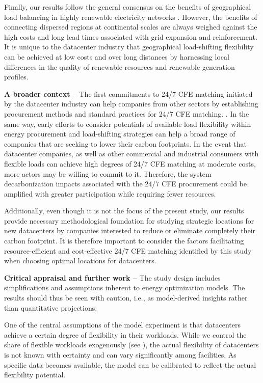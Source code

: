 Finally, our results follow the general consensus on the benefits of geographical load balancing in highly renewable electricity networks \cite{schlachtbergerBenefitsCooperationHighly2017}.
However, the benefits of connecting dispersed regions at continental scales are always weighed against the high costs and long lead times associated with grid expansion and reinforcement.
It is unique to the datacenter industry that geographical load-shifting flexibility can be achieved at low costs and over long distances by harnessing local differences in the quality of renewable resources and renewable generation profiles.

\textbf{A broader context --} The first commitments to 24/7 CFE matching initiated by the datacenter industry can help companies from other sectors by establishing procurement methods and standard practices for 24/7 CFE matching. \cite{xu-247CFE-report}.
In the same way, early efforts to consider potentials of available load flexibility within energy procurement and load-shifting strategies can help a broad range of companies that are seeking to lower their carbon footprints.
In the event that datacenter companies, as well as other commercial and industrial consumers with flexible loads can achieve high degrees of 24/7 CFE matching at moderate costs, more actors may be willing to commit to it.
Therefore, the system decarbonization impacts associated with the 24/7 CFE procurement \cite{riepinMeansCostsSystemlevel2023} could be amplified with greater participation while requiring fewer resources.

Additionally, even though it is not the focus of the present study, our results provide necessary methodological foundation for studying strategic locations for new datacenters by companies interested to reduce or eliminate completely their carbon footprint. It is therefore important to consider the factors facilitating resource-efficient and cost-effective 24/7 CFE matching identified by this study when choosing optimal locations for datacenters.

\textbf{Critical appraisal and further work --} The study design includes simplifications and assumptions inherent to energy optimization models. The results should thus be seen with caution, i.e., as model-derived insights rather than quantitative projections.

One of the central assumptions of the model experiment is that datacenters achieve a certain degree of flexibility in their workloads. While we control the share of flexible workloads exogenously (see ), the actual flexibility of datacenters is not known with certainty and can vary significantly among facilities.
As specific data becomes available, the model can be calibrated to reflect the actual flexibility potential.

